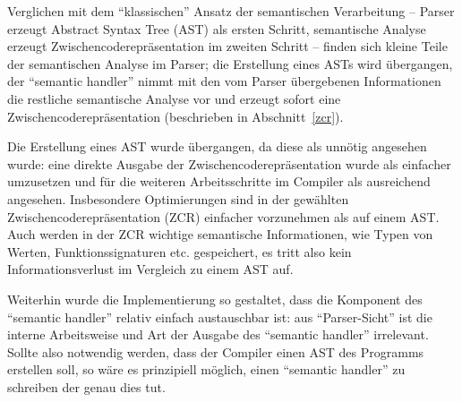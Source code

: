 \documentclass[twoside,a4paper,fleqn,12pt]{book}
\begin{document}

Verglichen mit dem "`klassischen"' Ansatz der semantischen Verarbeitung -- Parser erzeugt Abstract Syntax Tree (AST) als ersten Schritt,
semantische Analyse erzeugt Zwischencoderepräsentation im zweiten Schritt -- finden sich kleine Teile der semantischen
Analyse im Parser; die Erstellung eines ASTs wird übergangen, der ``semantic handler'' nimmt mit den vom
Parser übergebenen Informationen die restliche semantische Analyse vor und erzeugt sofort eine Zwischencoderepräsentation (beschrieben in Abschnitt~\ref{zcr}).

Die Erstellung eines AST wurde übergangen, da diese als unnötig angesehen wurde: eine direkte Ausgabe der Zwischencoderepräsentation
wurde als einfacher umzusetzen und für die weiteren Arbeitsschritte im Compiler als ausreichend angesehen. 
Insbesondere Optimierungen sind in der gewählten Zwischencoderepräsentation (ZCR) einfacher vorzunehmen als auf
einem AST. Auch werden in der ZCR wichtige semantische Informationen, wie Typen von Werten, Funktionssignaturen etc. gespeichert,
es tritt also kein Informationsverlust im Vergleich zu einem AST auf.

Weiterhin wurde die Implementierung so gestaltet, dass die Komponent des ``semantic handler'' relativ einfach austauschbar ist:
aus "`Parser-Sicht"' ist die interne Arbeitsweise und Art der Ausgabe des ``semantic handler'' irrelevant.
Sollte also notwendig werden, dass der Compiler einen AST des Programms erstellen soll, so wäre es prinzipiell möglich,
einen ``semantic handler'' zu schreiben der genau dies tut.


%   
\end{document}

